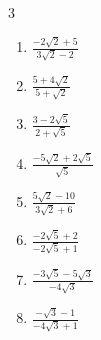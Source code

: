 \begin{multicols}{3}
\begin{enumerate}
  \item $\displaystyle \frac{-2\sqrt{2}+5}{3\sqrt{2}-2}$


  \item $\displaystyle \frac{5+4\sqrt{2}}{5+\sqrt{2}}$


  \item $\displaystyle \frac{3-2\sqrt{5}}{2+\sqrt{5}}$


\columnbreak %

  \item $\displaystyle \frac{-5\sqrt{2}+2\sqrt{5}}{\sqrt{5}}$


  \item $\displaystyle \frac{5\sqrt{2}-10}{3\sqrt{2}+6}$


  \item $\displaystyle \frac{-2\sqrt{5}+2}{-2\sqrt{5}+1}$


  \item $\displaystyle \frac{-3\sqrt{5}-5\sqrt{3}}{-4\sqrt{3}}$


  \item $\displaystyle \frac{-\sqrt{3}-1}{-4\sqrt{3}+1}$


\end{enumerate}
\end{multicols}

\newpage
\resetdrill

